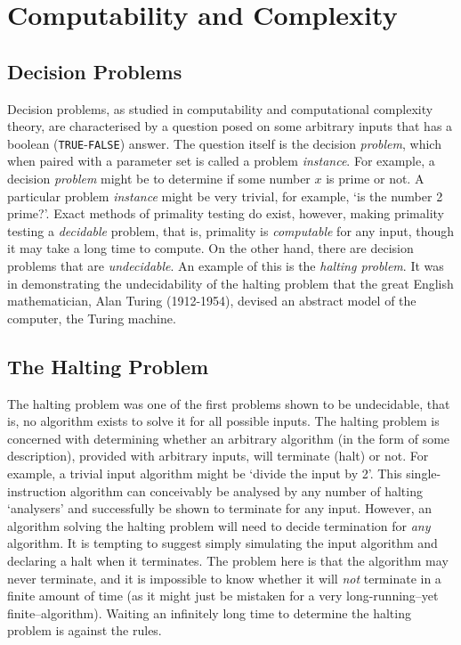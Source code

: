 \documentclass[11pt]{amsart}
\begin{document}
\section{Computability and Complexity}

\subsection{Decision Problems}

Decision problems, as studied in computability and computational complexity theory, are characterised by a question posed on some arbitrary inputs that has a boolean (\texttt{TRUE}-\texttt{FALSE}) answer. The question itself is the decision \emph{problem}, which when paired with a parameter set is called a problem \emph{instance}. For example, a decision \emph{problem} might be to determine if some number $x$ is prime or not. A particular problem \emph{instance} might be very trivial, for example, `is the number 2 prime?'. Exact methods of primality testing do exist, however, making primality testing a \emph{decidable} problem, that is, primality is \emph{computable} for any input, though it may take a long time to compute. On the other hand, there are decision problems that are \emph{undecidable}. An example of this is the \emph{halting problem}. It was in demonstrating the undecidability of the halting problem that the great English mathematician, Alan Turing (1912-1954), devised an abstract model of the computer, the Turing machine.

\subsection{The Halting Problem}

The halting problem was one of the first problems shown to be undecidable, that is, no algorithm exists to solve it for all possible inputs. The halting problem is concerned with determining whether an arbitrary algorithm (in the form of some description), provided with arbitrary inputs, will terminate (halt) or not. For example, a trivial input algorithm might be `divide the input by 2'. This single-instruction algorithm can conceivably be analysed by any number of halting `analysers' and successfully be shown to terminate for any input. However, an algorithm solving the halting problem will need to decide termination for \emph{any} algorithm. It is tempting to suggest simply simulating the input algorithm and declaring a halt when it terminates. The problem here is that the algorithm may never terminate, and it is impossible to know whether it will \emph{not} terminate in a finite amount of time (as it might just be mistaken for a very long-running--yet finite--algorithm). Waiting an infinitely long time to determine the halting problem is against the rules.
\end{document}

